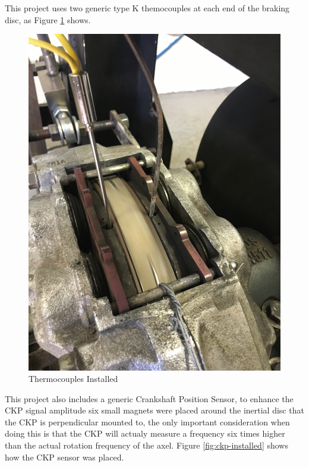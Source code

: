 		This project uses two generic type K themocouples at each end of the braking disc, as Figure \ref{fig:thermocouple-installation} shows.

		\begin{figure}[htbp]
			\centering
			\includegraphics[scale=0.05]{figuras/fig-thermocouple-installation}
			\caption{Thermocouples Installed}
			\label{fig:thermocouple-installation}
		\end{figure}
		\par

		This project also includes a generic Crankshaft Position Sensor, to enhance the CKP signal amplitude six small magnets were placed around the inertial disc that the CKP is perpendicular mounted to, the only important consideration when doing this is that the CKP will actualy measure a frequency six times higher than the actual rotation frequency of the axel. Figure \ref{fig:ckp-installed} shows how the CKP sensor was placed.

